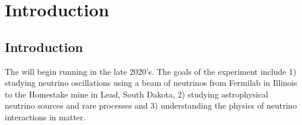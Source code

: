 \documentclass[../main-v1.tex]{subfiles}
\begin{document}















\chapter{Introduction  }
\label{ch:intro}


\listoftodos



\section{Introduction}\label{sec:intro-introduction}

The   will begin running in the late 2020's.  The goals of the experiment include 1) studying neutrino oscillations using a beam of neutrinos from Fermilab in Illinois to the Homestake mine in Lead, South Dakota, 2) studying  astrophysical neutrino sources and rare processes and 3) understanding  the physics of neutrino interactions in matter. 
\end{document}
